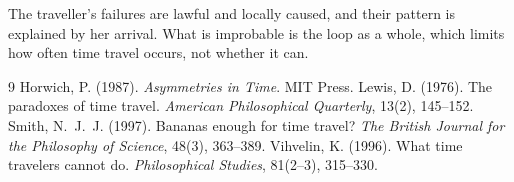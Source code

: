 \documentclass{situationist-preprint}
\begin{document}
The traveller's failures are lawful and locally caused, and their pattern is explained by her arrival. What is improbable is the loop as a whole, which limits how often time travel occurs, not whether it can.

\begin{thebibliography}{9}
 Horwich, P. (1987). \emph{Asymmetries in Time}. MIT Press.
 Lewis, D. (1976). The paradoxes of time travel. \emph{American Philosophical Quarterly}, 13(2), 145--152.
 Smith, N.~J.~J. (1997). Bananas enough for time travel? \emph{The British Journal for the Philosophy of Science}, 48(3), 363--389.
 Vihvelin, K. (1996). What time travelers cannot do. \emph{Philosophical Studies}, 81(2--3), 315--330.
\end{thebibliography}
\end{document}
